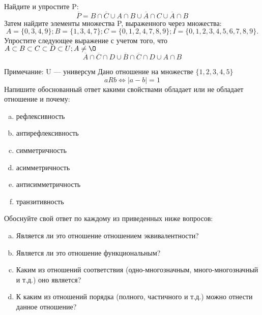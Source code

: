 \documentclass[10pt]{exam}
\begin{document}
\begin{questions}
\question
Найдите и упростите P:
\begin{equation*}
\overline{P} = B \cap \overline{C} \cup A \cap B \cup \overline{A} \cap C \cup \overline{A} \cap B
\end{equation*}
Затем найдите элементы множества P, выраженного через множества:
\begin{equation*}
A = \{0, 3, 4, 9\}; 
B = \{1, 3, 4, 7\};
C = \{0, 1, 2, 4, 7, 8, 9\};
I = \{0, 1, 2, 3, 4, 5, 6, 7, 8, 9\}.
\end{equation*}\question
Упростите следующее выражение с учетом того, что $A\subset B \subset C \subset D \subset U; A \neq \O$
\begin{equation*}
\overline{A} \cap \overline{C} \cap D \cup \overline{B} \cap \overline{C} \cap D \cup A \cap B
\end{equation*}

Примечание: U — универсум\question
Дано отношение на множестве $\{1, 2, 3, 4, 5\}$ 
\begin{equation*}
aRb \iff |a-b| = 1
\end{equation*}
Напишите обоснованный ответ какими свойствами обладает или не обладает отношение и почему:   
\begin{enumerate} [a)]\setcounter{enumi}{0}
\item рефлексивность
\item антирефлексивность
\item симметричность
\item асимметричность
\item антисимметричность
\item транзитивность
\end{enumerate}

Обоснуйте свой ответ по каждому из приведенных ниже вопросов:
\begin{enumerate} [a)]\setcounter{enumi}{0}
    \item Является ли это отношение отношением эквивалентности?
    \item Является ли это отношение функциональным?
    \item Каким из отношений соответствия (одно-многозначным, много-многозначный и т.д.) оно является?
    \item К каким из отношений порядка (полного, частичного и т.д.) можно отнести данное отношение?
\end{enumerate}


\end{questions}
\end{document}
